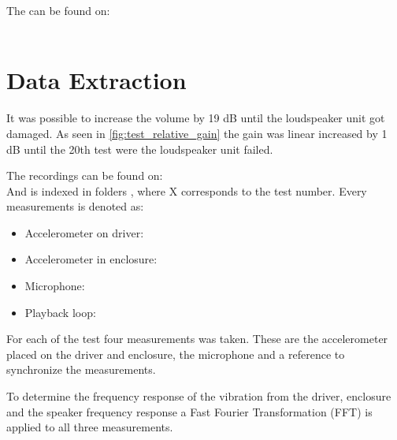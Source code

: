 The  can be found on:\\
\\

%



\section{Data Extraction}

It was possible to increase the volume by 19 dB until the loudspeaker unit got damaged. As seen in \autoref{fig:test_relative_gain} the gain was linear increased by 1 dB until the 20th test were the loudspeaker unit failed.

The recordings can be found on:\\
And is indexed in folders , where X corresponds to the test number. Every measurements is denoted as:
\begin{itemize}
\item Accelerometer on driver: 
\item Accelerometer in enclosure: 
\item Microphone: 
\item Playback loop: 
\end{itemize}

\begin{figure}[H]
\centering
{}

\caption{}
\label{fig:test_relative_gain}
\end{figure}

For each of the test four measurements was taken. These are the accelerometer placed on the driver and enclosure, the microphone and a reference to synchronize the measurements. 


To determine the frequency response of the vibration from the driver, enclosure and the speaker frequency response a Fast Fourier Transformation (FFT) is applied to all three measurements.

